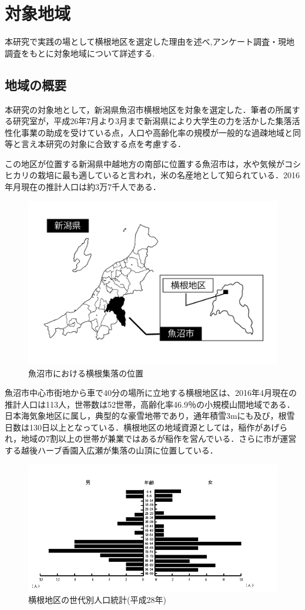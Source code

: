 \documentclass[a4paper]{jsarticle}
\begin{document}
\newpage
\section{対象地域}
本研究で実践の場として横根地区を選定した理由を述べ,アンケート調査・現地調査をもとに対象地域について詳述する.
\subsection{地域の概要}
本研究の対象地として，新潟県魚沼市横根地区を対象を選定した．筆者の所属する研究室が，平成26年7月より3月まで新潟県により大学生の力を活かした集落活性化事業の助成を受けている点，人口や高齢化率の規模が一般的な過疎地域と同等と言え本研究の対象に合致する点を考慮する．\par
この地区が位置する新潟県中越地方の南部に位置する魚沼市は，水や気候がコシヒカリの栽培に最も適していると言われ，米の名産地として知られている．2016年月現在の推計人口は約3万7千人である．\par
\begin{figure}[H]
  \begin{center}
    \includegraphics[width=0.7\hsize]{./images/yokone_place.pdf}
    \caption{魚沼市における横根集落の位置}
    \label{fig:tmu_hino}
  \end{center}
\end{figure}
魚沼市中心市街地から車で40分の場所に立地する横根地区は、2016年4月現在の推計人口は113人，世帯数は52世帯，高齢化率46.9％の小規模山間地域である．日本海気象地区に属し，典型的な豪雪地帯であり，通年積雪3mにも及び，根雪日数は130日以上となっている．横根地区の地域資源としては，稲作があげられ，地域の7割以上の世帯が兼業ではあるが稲作を営んでいる．さらに市が運営する越後ハーブ香園入広瀬が集落の山頂に位置している．\par
\begin{figure}[H]
  \begin{center}
    \includegraphics[width=0.9\hsize]{./images/zinnkou.jpg}
    \caption{横根地区の世代別人口統計(平成28年)}
    \label{fig:tmu_hino}
  \end{center}
\end{figure}
\end{document}
